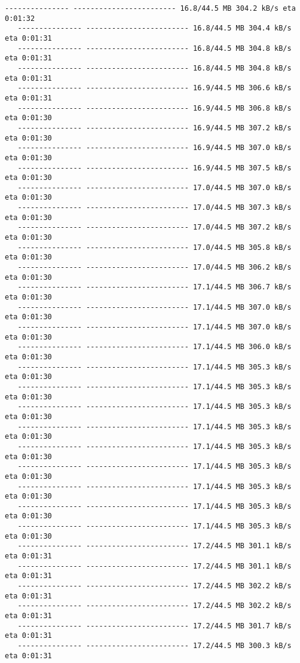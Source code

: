 \documentclass[11pt]{article}
\begin{document}
\begin{Verbatim}[commandchars=\\\{\}]
   --------------- ------------------------ 16.8/44.5 MB 304.2 kB/s eta 0:01:32
   --------------- ------------------------ 16.8/44.5 MB 304.4 kB/s eta 0:01:31
   --------------- ------------------------ 16.8/44.5 MB 304.8 kB/s eta 0:01:31
   --------------- ------------------------ 16.8/44.5 MB 304.8 kB/s eta 0:01:31
   --------------- ------------------------ 16.9/44.5 MB 306.6 kB/s eta 0:01:31
   --------------- ------------------------ 16.9/44.5 MB 306.8 kB/s eta 0:01:30
   --------------- ------------------------ 16.9/44.5 MB 307.2 kB/s eta 0:01:30
   --------------- ------------------------ 16.9/44.5 MB 307.0 kB/s eta 0:01:30
   --------------- ------------------------ 16.9/44.5 MB 307.5 kB/s eta 0:01:30
   --------------- ------------------------ 17.0/44.5 MB 307.0 kB/s eta 0:01:30
   --------------- ------------------------ 17.0/44.5 MB 307.3 kB/s eta 0:01:30
   --------------- ------------------------ 17.0/44.5 MB 307.2 kB/s eta 0:01:30
   --------------- ------------------------ 17.0/44.5 MB 305.8 kB/s eta 0:01:30
   --------------- ------------------------ 17.0/44.5 MB 306.2 kB/s eta 0:01:30
   --------------- ------------------------ 17.1/44.5 MB 306.7 kB/s eta 0:01:30
   --------------- ------------------------ 17.1/44.5 MB 307.0 kB/s eta 0:01:30
   --------------- ------------------------ 17.1/44.5 MB 307.0 kB/s eta 0:01:30
   --------------- ------------------------ 17.1/44.5 MB 306.0 kB/s eta 0:01:30
   --------------- ------------------------ 17.1/44.5 MB 305.3 kB/s eta 0:01:30
   --------------- ------------------------ 17.1/44.5 MB 305.3 kB/s eta 0:01:30
   --------------- ------------------------ 17.1/44.5 MB 305.3 kB/s eta 0:01:30
   --------------- ------------------------ 17.1/44.5 MB 305.3 kB/s eta 0:01:30
   --------------- ------------------------ 17.1/44.5 MB 305.3 kB/s eta 0:01:30
   --------------- ------------------------ 17.1/44.5 MB 305.3 kB/s eta 0:01:30
   --------------- ------------------------ 17.1/44.5 MB 305.3 kB/s eta 0:01:30
   --------------- ------------------------ 17.1/44.5 MB 305.3 kB/s eta 0:01:30
   --------------- ------------------------ 17.1/44.5 MB 305.3 kB/s eta 0:01:30
   --------------- ------------------------ 17.2/44.5 MB 301.1 kB/s eta 0:01:31
   --------------- ------------------------ 17.2/44.5 MB 301.1 kB/s eta 0:01:31
   --------------- ------------------------ 17.2/44.5 MB 302.2 kB/s eta 0:01:31
   --------------- ------------------------ 17.2/44.5 MB 302.2 kB/s eta 0:01:31
   --------------- ------------------------ 17.2/44.5 MB 301.7 kB/s eta 0:01:31
   --------------- ------------------------ 17.2/44.5 MB 300.3 kB/s eta 0:01:31

\end{Verbatim}
\end{document}

